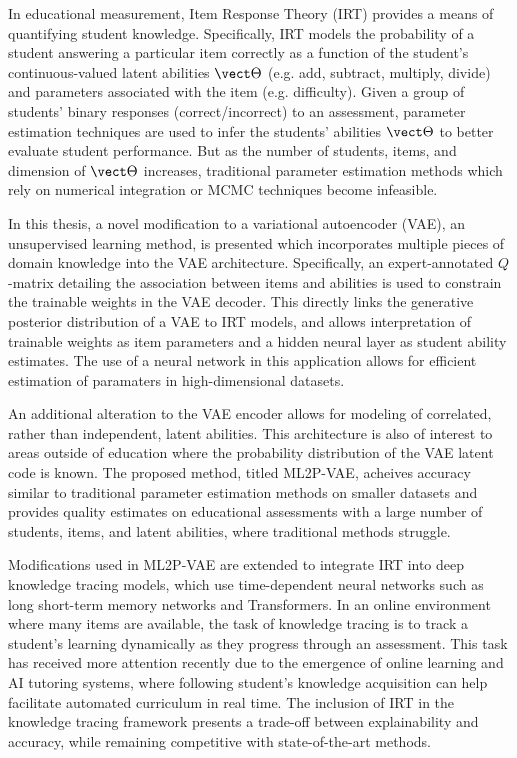 
In educational measurement, Item Response Theory (IRT) provides a means of quantifying student knowledge. Specifically, IRT models the probability of a student answering a particular item correctly as a function of the student's continuous-valued latent abilities $\vect \Theta$ (e.g. add, subtract, multiply, divide) and parameters associated with the item (e.g. difficulty). Given a group of students' binary responses (correct/incorrect) to an assessment, parameter estimation techniques are used to infer the students' abilities $\vect \Theta$ to better evaluate student performance. But as the number of students, items, and dimension of $\vect \Theta$ increases, traditional parameter estimation methods which rely on numerical integration or MCMC techniques become infeasible. 

In this thesis, a novel modification to a variational autoencoder (VAE), an unsupervised learning method, is presented which incorporates multiple pieces of domain knowledge into the VAE architecture. Specifically, an expert-annotated $Q$-matrix detailing the association between items and abilities is used to constrain the trainable weights in the VAE decoder. This directly links the generative posterior distribution of a VAE to IRT models, and allows interpretation of trainable weights as item parameters and a hidden neural layer as student ability estimates. The use of a neural network in this application allows for efficient estimation of paramaters in high-dimensional datasets.

An additional alteration to the VAE encoder allows for modeling of correlated, rather than independent, latent abilities. This architecture is also of interest to areas outside of education where the probability distribution of the VAE latent code is known. The proposed method, titled ML2P-VAE, acheives accuracy similar to traditional parameter estimation methods on smaller datasets and provides quality estimates on educational assessments with a large number of students, items, and latent abilities, where traditional methods struggle.

Modifications used in ML2P-VAE are extended to integrate IRT into deep knowledge tracing models, which use time-dependent neural networks such as long short-term memory networks and Transformers. In an online environment where many items are available, the task of knowledge tracing is to track a student's learning dynamically as they progress through an assessment. This task has received more attention recently due to the emergence of online learning and AI tutoring systems, where following student's knowledge acquisition can help facilitate automated curriculum in real time. The inclusion of IRT in the knowledge tracing framework presents a trade-off between explainability and accuracy, while remaining competitive with state-of-the-art methods.


